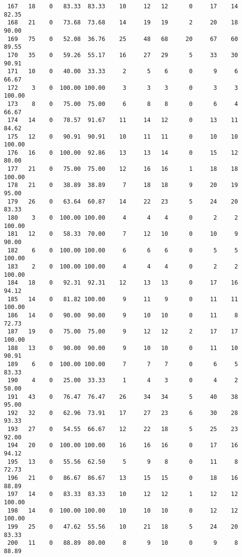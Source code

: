 \begin{verbatim}
 167   18    0   83.33  83.33    10     12   12      0     17    14    82.35
 168   21    0   73.68  73.68    14     19   19      2     20    18    90.00
 169   75    0   52.08  36.76    25     48   68     20     67    60    89.55
 170   35    0   59.26  55.17    16     27   29      5     33    30    90.91
 171   10    0   40.00  33.33     2      5    6      0      9     6    66.67
 172    3    0  100.00 100.00     3      3    3      0      3     3   100.00
 173    8    0   75.00  75.00     6      8    8      0      6     4    66.67
 174   14    0   78.57  91.67    11     14   12      0     13    11    84.62
 175   12    0   90.91  90.91    10     11   11      0     10    10   100.00
 176   16    0  100.00  92.86    13     13   14      0     15    12    80.00
 177   21    0   75.00  75.00    12     16   16      1     18    18   100.00
 178   21    0   38.89  38.89     7     18   18      9     20    19    95.00
 179   26    0   63.64  60.87    14     22   23      5     24    20    83.33
 180    3    0  100.00 100.00     4      4    4      0      2     2   100.00
 181   12    0   58.33  70.00     7     12   10      0     10     9    90.00
 182    6    0  100.00 100.00     6      6    6      0      5     5   100.00
 183    2    0  100.00 100.00     4      4    4      0      2     2   100.00
 184   18    0   92.31  92.31    12     13   13      0     17    16    94.12
 185   14    0   81.82 100.00     9     11    9      0     11    11   100.00
 186   14    0   90.00  90.00     9     10   10      0     11     8    72.73
 187   19    0   75.00  75.00     9     12   12      2     17    17   100.00
 188   13    0   90.00  90.00     9     10   10      0     11    10    90.91
 189    6    0  100.00 100.00     7      7    7      0      6     5    83.33
 190    4    0   25.00  33.33     1      4    3      0      4     2    50.00
 191   43    0   76.47  76.47    26     34   34      5     40    38    95.00
 192   32    0   62.96  73.91    17     27   23      6     30    28    93.33
 193   27    0   54.55  66.67    12     22   18      5     25    23    92.00
 194   20    0  100.00 100.00    16     16   16      0     17    16    94.12
 195   13    0   55.56  62.50     5      9    8      0     11     8    72.73
 196   21    0   86.67  86.67    13     15   15      0     18    16    88.89
 197   14    0   83.33  83.33    10     12   12      1     12    12   100.00
 198   14    0  100.00 100.00    10     10   10      0     12    12   100.00
 199   25    0   47.62  55.56    10     21   18      5     24    20    83.33
 200   11    0   88.89  80.00     8      9   10      0      9     8    88.89

\end{verbatim}
